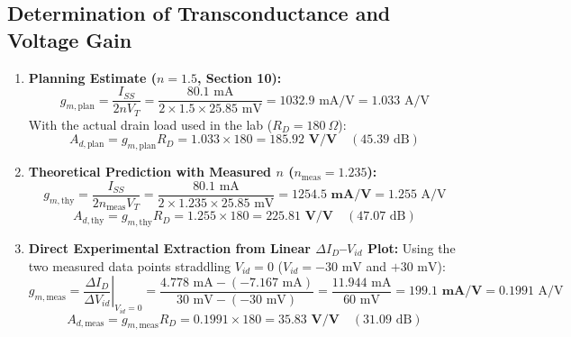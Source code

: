 \documentclass[11pt,a4paper]{article}
\begin{document}
\subsection{Determination of Transconductance and Voltage Gain}
\begin{enumerate}
    \item \textbf{Planning Estimate ($n = 1.5$, Section 10):}
    \begin{equation}
        g_{m,\text{plan}} = \frac{I_{SS}}{2 n V_T} = \frac{80.1\text{ mA}}{2 \times 1.5 \times 25.85\text{ mV}} = 1032.9\text{ mA/V} = 1.033\text{ A/V}
    \end{equation}
    With the actual drain load used in the lab ($R_D = 180\ \Omega$):
    \begin{equation}
        A_{d,\text{plan}} = g_{m,\text{plan}} R_D = 1.033 \times 180 = \mathbf{185.92\text{ V/V}} \quad (45.39\text{ dB})
    \end{equation}

    \item \textbf{Theoretical Prediction with Measured $n$ ($n_{\text{meas}} = 1.235$):}
    \begin{equation}
        g_{m,\text{thy}} = \frac{I_{SS}}{2 n_{\text{meas}} V_T} = \frac{80.1\text{ mA}}{2 \times 1.235 \times 25.85\text{ mV}} = \mathbf{1254.5\text{ mA/V}} = 1.255\text{ A/V}
    \end{equation}
    \begin{equation}
        A_{d,\text{thy}} = g_{m,\text{thy}} R_D = 1.255 \times 180 = \mathbf{225.81\text{ V/V}} \quad (47.07\text{ dB})
    \end{equation}

    \item \textbf{Direct Experimental Extraction from Linear $\Delta I_D$--$V_{id}$ Plot:}
    Using the two measured data points straddling $V_{id} = 0$ ($V_{id} = -30\text{ mV}$ and $+30\text{ mV}$):
    \begin{equation}
        g_{m,\text{meas}} = \left.\frac{\Delta I_D}{\Delta V_{id}}\right|_{V_{id}=0} = \frac{4.778\text{ mA} - (-7.167\text{ mA})}{30\text{ mV} - (-30\text{ mV})} = \frac{11.944\text{ mA}}{60\text{ mV}} = \mathbf{199.1\text{ mA/V}} = 0.1991\text{ A/V}
    \end{equation}
    \begin{equation}
        A_{d,\text{meas}} = g_{m,\text{meas}} R_D = 0.1991 \times 180 = \mathbf{35.83\text{ V/V}} \quad (31.09\text{ dB})
    \end{equation}
\end{enumerate}
\end{document}
